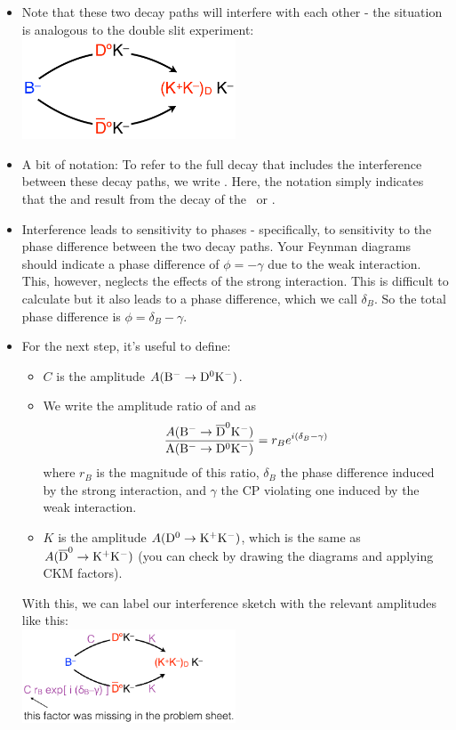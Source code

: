 \begin{enumerate}[a)]
\begin{itemize}
 \item Note that these two decay paths will interfere with each other - the situation is analogous to the double slit experiment:
 \\\includegraphics[width=0.5\textwidth]{problemsheets/ps2figs/B2DK_D2KK_interference}
 \item A bit of notation: To refer to the full decay that includes the interference between these decay paths, we write
 .
 Here, the notation  simply indicates that the  and  result from the decay of the \Do\ or \Dob. 
 \item Interference leads to sensitivity to phases - specifically, to sensitivity to the phase difference between the two decay paths. Your Feynman diagrams should indicate a phase difference of $\phi = -\gamma$ due to the weak interaction. This, however, neglects the effects of the strong interaction. This is difficult to calculate but it also leads to a phase difference, which we call $\delta_B$. So the total phase difference is $\phi = \delta_B - \gamma$.
 \item For the next step, it's useful to define:
 \begin{itemize}
 \item $C$ is the amplitude $A({\rm B^- \to D^0 K^-})$.
 \item We write the amplitude ratio of  and  as
 \[
    \frac{A({\rm B^- \to {\rm \overline{D}^0} K^-})}{{\rm A(B^- \to {\rm D^{0}} K^-})} = r_B e^{i(\delta_B - \gamma)}
 \]  
 where $r_B$ is the magnitude of this ratio, $\delta_B$ the phase difference induced by the strong interaction, and $\gamma$ the CP violating one induced by the weak interaction.
 \item $K$ is the amplitude $A({\rm  {\rm D^{0}} \to K^+ K^-})$, which is the same as $A({\rm  {\rm \overline{D}^0} \to K^+ K^-})$ (you can check by drawing the diagrams and applying CKM factors).
 \end{itemize}
 With this, we can label our interference sketch with the relevant amplitudes like this:\\
 \includegraphics[width=0.5\textwidth]{problemsheets/ps2figs/B2DK_D2KK_interference_labelled}\\

\end{itemize}
\end{enumerate}
